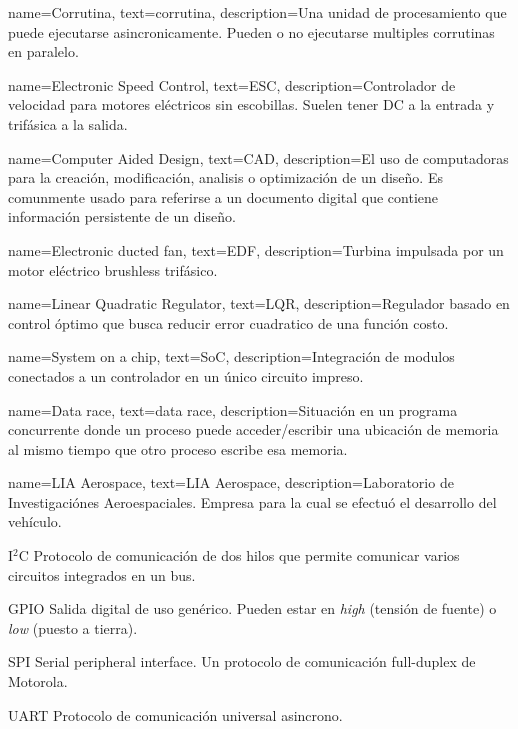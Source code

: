 \usepackage[sort=none,abbreviations]{glossaries-extra}

{
	name=Corrutina,
    text=corrutina,
	description={Una unidad de procesamiento que puede ejecutarse asincronicamente. Pueden o no ejecutarse multiples corrutinas en paralelo.}
}

{
	name=Electronic Speed Control,
	text=ESC,
	description={Controlador de velocidad para motores eléctricos sin escobillas. Suelen tener DC a la entrada y trifásica a la salida.}
}

{
	name=Computer Aided Design,
	text=CAD,
	description={El uso de computadoras para la creación, modificación, analisis o optimización de un diseño. Es comunmente usado para referirse a un documento digital que contiene información persistente de un diseño.}
}

{
	name=Electronic ducted fan,
	text=EDF,
	description={Turbina impulsada por un motor eléctrico brushless trifásico.}
}

{
	name=Linear Quadratic Regulator,
	text=LQR,
	description={Regulador basado en control óptimo que busca reducir error cuadratico de una función costo.}
}

{
	name=System on a chip,
	text=SoC,
	description={Integración de modulos conectados a un controlador en un único circuito impreso.}
}

{
	name=Data race,
	text=data race,
	description={Situación en un programa concurrente donde un proceso puede acceder/escribir una ubicación de memoria al mismo tiempo que otro proceso escribe esa memoria.}
}

{
	name=LIA Aerospace,
	text=LIA Aerospace,
	description={Laboratorio de Investigaciónes Aeroespaciales. Empresa para la cual se efectuó el desarrollo del vehículo.}
}

{I$^2$C}
{Protocolo de comunicación de dos hilos que permite comunicar varios circuitos integrados en un bus.}

{GPIO}
{Salida digital de uso genérico. Pueden estar en \emph{high} (tensión de fuente) o \emph{low} (puesto a tierra).}

{SPI}
{Serial peripheral interface. Un protocolo de comunicación full-duplex de Motorola.}

{UART}
{Protocolo de comunicación universal asincrono.}

